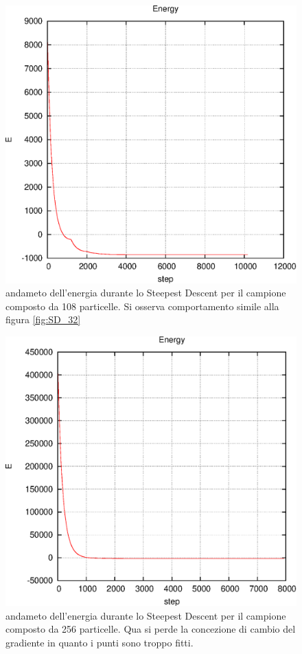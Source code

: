 \documentclass[a4paper,11pt]{article}
\begin{document}
			\begin{figure}[H]
				\centering
				\includegraphics[scale=0.7]{E_SD_108.eps}
				\caption{andameto dell'energia durante lo Steepest Descent per il campione composto da 108 particelle. Si osserva comportamento simile alla figura \ref{fig:SD_32}}
				\label{fig:SD_108}
			\end{figure}
			\begin{figure}[H]
				\centering
				\includegraphics[scale=0.7]{E_SD_256.eps}
				\caption{andameto dell'energia durante lo Steepest Descent per il campione composto da 256 particelle. Qua si perde la concezione di cambio del gradiente in quanto i punti sono troppo fitti.}
				\label{fig:SD_256}
			\end{figure}
\end{document}
